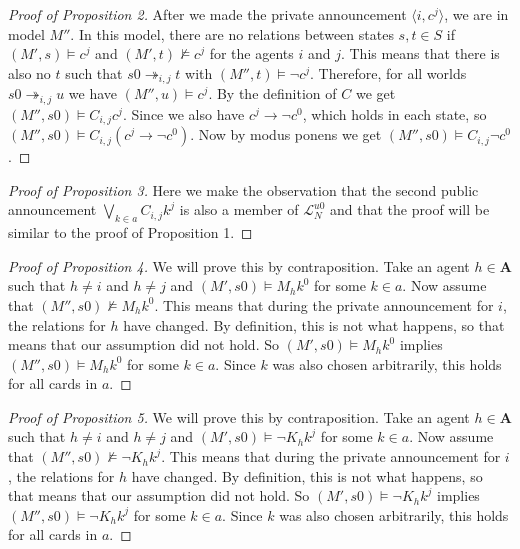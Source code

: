 \documentclass[a4paper, 10pt]{article}
\newcommand{\impl}{\rightarrow}
\newcommand{\A}{\mathbf{A}}
\begin{document}
\begin{proof}[Proof of Proposition 2]
    After we made the private announcement $\langle i, c^j\rangle$, we are
    in model $M''$. In this model, there are no relations between states
    $s, t \in S$ if $(M', s) \models c^j$ and $(M', t) \not \models c^j$
    for the agents $i$ and $j$. This means that there is also no $t$ such
    that $s0 \twoheadrightarrow_{i,j} t$ with $(M'', t) \models \neg c^j$.
    Therefore, for all worlds $s0 \twoheadrightarrow_{i,j} u$ we have
    $(M'', u) \models c^j$. By the definition of $C$ we get $(M'', s0)
    \models C_{i,j} c^j$. Since we also have $c^j \impl \neg c^0$, which
    holds in each state, so $(M'', s0) \models C_{i,j} (c^j \impl \neg
    c^0)$. Now by modus ponens we get $(M'', s0) \models C_{i,j} \neg c^0$.
\end{proof}

\begin{proof}[Proof of Proposition 3]
    Here we make the observation that the second public announcement
    $\bigvee_{k\in a} C_{i,j} k^j$ is also a member of
    $\mathcal{L}_N^{u0}$ and that the proof will be similar to the proof of
    Proposition 1.
\end{proof}

\begin{proof}[Proof of Proposition 4]
    We will prove this by contraposition.
    Take an agent $h \in \A$ such that $h \not = i$ and $h \not = j$ and
    $(M', s0) \models M_h k^0$ for some $k \in a$. Now assume that $(M'',
    s0) \not \models M_h k^0$. This means that during the private
    announcement for $i$, the relations for $h$ have changed. By
    definition, this is not what happens, so that means that our assumption
    did not hold. So $(M', s0) \models M_h k^0$ implies $(M'', s0) \models
    M_h k^0$ for some $k \in a$. Since $k$ was also chosen arbitrarily,
    this holds for all cards in $a$. 
\end{proof}

\begin{proof}[Proof of Proposition 5]
    We will prove this by contraposition.
    Take an agent $h \in \A$ such that $h \not = i$ and $h \not = j$ and
    $(M', s0) \models \neg K_h k^j$ for some $k \in a$. Now assume that
    $(M'', s0) \not \models \neg K_h k^j$. This means that during the private
    announcement for $i$, the relations for $h$ have changed. By
    definition, this is not what happens, so that means that our assumption
    did not hold. So $(M', s0) \models \neg K_h k^j$ implies $(M'', s0) \models
    \neg K_h k^j$ for some $k \in a$. Since $k$ was also chosen arbitrarily,
    this holds for all cards in $a$. 
\end{proof}



\end{document}
